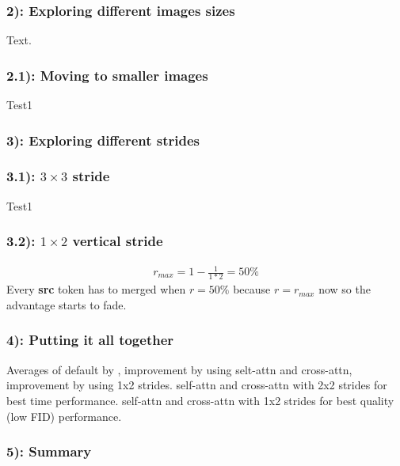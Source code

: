 \newpage
\subsubsection*{2): Exploring different images sizes}
Text.
\subsubsection*{2.1): Moving to smaller images}
Test1
\begin{figure}[!htb]
    
    
\end{figure}

\newpage
\subsubsection*{3): Exploring different strides}
\subsubsection*{3.1): $3 \times 3$ stride}
Test1
\subsubsection*{3.2): $1 \times 2$ vertical stride}
\begin{align*}
    r_{max} = 1-\frac{1}{1*2} = 50\%
\end{align*}
Every  \textbf{src} token has to merged when \(r=50\%\) because \(r=r_{max}\) now so the advantage starts to fade.

\begin{figure}[!htb]
    
    
\end{figure}

\newpage
\subsubsection*{4): Putting it all together}
Averages of default by \cite{bolya2023tomesd}, improvement by using selt-attn and cross-attn, improvement by using 1x2 strides. 
self-attn and cross-attn with 2x2 strides for best time performance. self-attn and cross-attn with 1x2 strides for best quality (low FID) performance.
\begin{figure}[!htb]
    
    
\end{figure}

\subsubsection*{5): Summary}